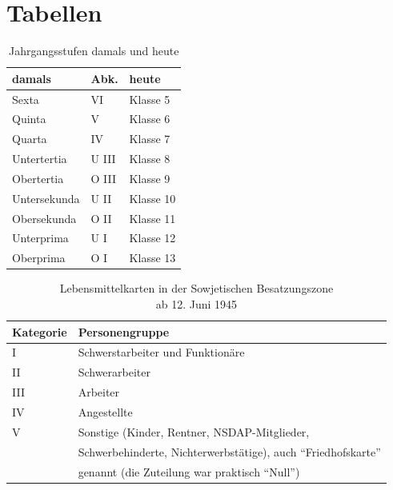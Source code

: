 \documentclass[a5paper,pagesize,10pt,twoside=true]{scrbook}
\begin{document}
\newpage
\section*{Tabellen}
\begin{table}[h!]
	\label{tab:jahrgangsstufen}
	\centering
	\begin{tabular}{l|l||l}
		damals & Abk. & heute \\
		\hline
		Sexta & VI & Klasse 5 \\
		Quinta & V & Klasse 6 \\
		Quarta & IV & Klasse 7 \\
		Untertertia & U III & Klasse 8 \\
		Obertertia & O III & Klasse 9 \\
		Untersekunda & U II & Klasse 10 \\
		Obersekunda & O II & Klasse 11 \\
		Unterprima & U I & Klasse 12 \\
		Oberprima & O I & Klasse 13 \\
	\end{tabular}
	\caption{Jahrgangsstufen damals und heute}
\end{table}

\begin{table}[h!]
	\label{tab:lebensmittelkarten}
	\centering	
	\begin{tabular}{l|l}
		Kategorie & Personengruppe \\
		\hline
		I & Schwerstarbeiter und Funktionäre \\
		II & Schwerarbeiter \\
		III & Arbeiter \\
		IV & Angestellte \\
		V & Sonstige (Kinder, Rentner, NSDAP-Mitglieder, \\
		& Schwerbehinderte, Nichterwerbstätige), auch \enquote{Friedhofskarte}\\
		& genannt (die Zuteilung war praktisch \enquote{Null})
	\end{tabular}
	\caption{Lebensmittelkarten in der Sowjetischen Besatzungszone\\ ab 12. Juni 1945}
\end{table}
\end{document}
